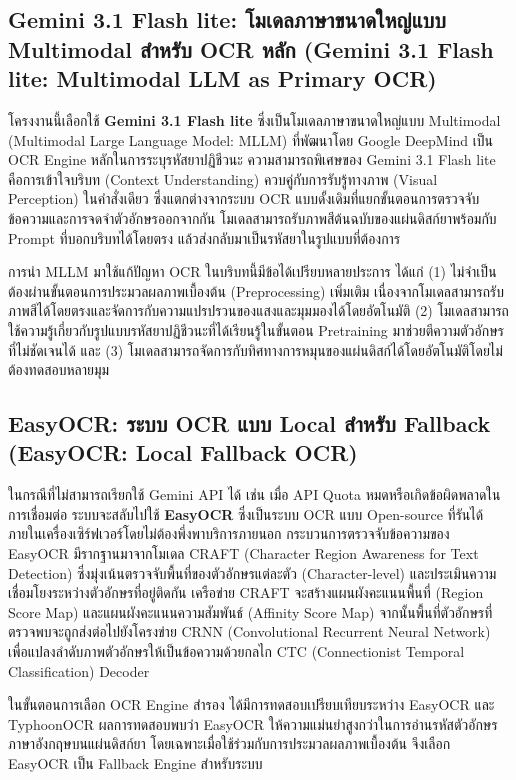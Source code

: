 \subsection{Gemini 3.1 Flash lite: โมเดลภาษาขนาดใหญ่แบบ Multimodal สำหรับ OCR หลัก (Gemini 3.1 Flash lite: Multimodal LLM as Primary OCR)}

โครงงานนี้เลือกใช้ \textbf{Gemini 3.1 Flash lite} \cite{google2025gemini} ซึ่งเป็นโมเดลภาษาขนาดใหญ่แบบ Multimodal (Multimodal Large Language Model: MLLM) ที่พัฒนาโดย Google DeepMind เป็น OCR Engine หลักในการระบุรหัสยาปฏิชีวนะ ความสามารถพิเศษของ Gemini 3.1 Flash lite คือการเข้าใจบริบท (Context Understanding) ควบคู่กับการรับรู้ทางภาพ (Visual Perception) ในคำสั่งเดียว ซึ่งแตกต่างจากระบบ OCR แบบดั้งเดิมที่แยกขั้นตอนการตรวจจับข้อความและการจดจำตัวอักษรออกจากกัน โมเดลสามารถรับภาพสีต้นฉบับของแผ่นดิสก์ยาพร้อมกับ Prompt ที่บอกบริบทได้โดยตรง แล้วส่งกลับมาเป็นรหัสยาในรูปแบบที่ต้องการ

การนำ MLLM มาใช้แก้ปัญหา OCR ในบริบทนี้มีข้อได้เปรียบหลายประการ ได้แก่ (1) ไม่จำเป็นต้องผ่านขั้นตอนการประมวลผลภาพเบื้องต้น (Preprocessing) เพิ่มเติม เนื่องจากโมเดลสามารถรับภาพสีได้โดยตรงและจัดการกับความแปรปรวนของแสงและมุมมองได้โดยอัตโนมัติ (2) โมเดลสามารถใช้ความรู้เกี่ยวกับรูปแบบรหัสยาปฏิชีวนะที่ได้เรียนรู้ในขั้นตอน Pretraining มาช่วยตีความตัวอักษรที่ไม่ชัดเจนได้ และ (3) โมเดลสามารถจัดการกับทิศทางการหมุนของแผ่นดิสก์ได้โดยอัตโนมัติโดยไม่ต้องทดสอบหลายมุม

\subsection{EasyOCR: ระบบ OCR แบบ Local สำหรับ Fallback (EasyOCR: Local Fallback OCR)}

ในกรณีที่ไม่สามารถเรียกใช้ Gemini API ได้ เช่น เมื่อ API Quota หมดหรือเกิดข้อผิดพลาดในการเชื่อมต่อ ระบบจะสลับไปใช้ \textbf{EasyOCR} \cite{jaidedai2024easyocr} ซึ่งเป็นระบบ OCR แบบ Open-source ที่รันได้ภายในเครื่องเซิร์ฟเวอร์โดยไม่ต้องพึ่งพาบริการภายนอก กระบวนการตรวจจับข้อความของ EasyOCR มีรากฐานมาจากโมเดล CRAFT (Character Region Awareness for Text Detection) \cite{baek2019craft} ซึ่งมุ่งเน้นตรวจจับพื้นที่ของตัวอักษรแต่ละตัว (Character-level) และประเมินความเชื่อมโยงระหว่างตัวอักษรที่อยู่ติดกัน เครือข่าย CRAFT จะสร้างแผนผังคะแนนพื้นที่ (Region Score Map) และแผนผังคะแนนความสัมพันธ์ (Affinity Score Map) จากนั้นพื้นที่ตัวอักษรที่ตรวจพบจะถูกส่งต่อไปยังโครงข่าย CRNN (Convolutional Recurrent Neural Network) เพื่อแปลงลำดับภาพตัวอักษรให้เป็นข้อความด้วยกลไก CTC (Connectionist Temporal Classification) Decoder

ในขั้นตอนการเลือก OCR Engine สำรอง ได้มีการทดสอบเปรียบเทียบระหว่าง EasyOCR \cite{jaidedai2024easyocr} และ TyphoonOCR \cite{typhoonocr2025} ผลการทดสอบพบว่า EasyOCR ให้ความแม่นยำสูงกว่าในการอ่านรหัสตัวอักษรภาษาอังกฤษบนแผ่นดิสก์ยา โดยเฉพาะเมื่อใช้ร่วมกับการประมวลผลภาพเบื้องต้น จึงเลือก EasyOCR เป็น Fallback Engine สำหรับระบบ

